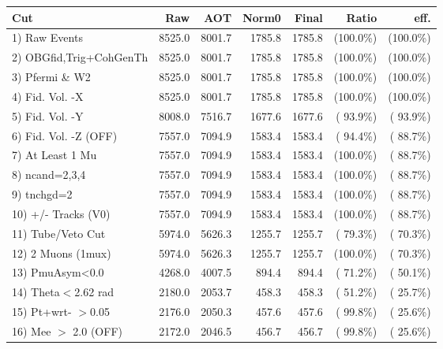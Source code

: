  \begin{table}[h!]\centering
 \begin{tabular}{||l||r|r|r|r|r|r||}
 \hline
 \hline
 Cut & Raw & AOT & Norm0 & Final & Ratio & eff.       \\
 \hline
  1) Raw Events           &       8525.0 &       8001.7 &       1785.8 &       1785.8 & (100.0\%) & (100.0\%) \\
  2) OBGfid,Trig+CohGenTh &       8525.0 &       8001.7 &       1785.8 &       1785.8 & (100.0\%) & (100.0\%) \\
  3) Pfermi \& W2         &       8525.0 &       8001.7 &       1785.8 &       1785.8 & (100.0\%) & (100.0\%) \\
  4) Fid. Vol. -X         &       8525.0 &       8001.7 &       1785.8 &       1785.8 & (100.0\%) & (100.0\%) \\
  5) Fid. Vol. -Y         &       8008.0 &       7516.7 &       1677.6 &       1677.6 & ( 93.9\%) & ( 93.9\%) \\
  6) Fid. Vol. -Z (OFF)   &       7557.0 &       7094.9 &       1583.4 &       1583.4 & ( 94.4\%) & ( 88.7\%) \\
  7) At Least 1 Mu        &       7557.0 &       7094.9 &       1583.4 &       1583.4 & (100.0\%) & ( 88.7\%) \\
  8) ncand=2,3,4          &       7557.0 &       7094.9 &       1583.4 &       1583.4 & (100.0\%) & ( 88.7\%) \\
  9) tnchgd=2             &       7557.0 &       7094.9 &       1583.4 &       1583.4 & (100.0\%) & ( 88.7\%) \\
 10) +/- Tracks (V0)      &       7557.0 &       7094.9 &       1583.4 &       1583.4 & (100.0\%) & ( 88.7\%) \\
 11) Tube/Veto Cut        &       5974.0 &       5626.3 &       1255.7 &       1255.7 & ( 79.3\%) & ( 70.3\%) \\
 12) 2 Muons (1mux)       &       5974.0 &       5626.3 &       1255.7 &       1255.7 & (100.0\%) & ( 70.3\%) \\
 13) PmuAsym<0.0          &       4268.0 &       4007.5 &        894.4 &        894.4 & ( 71.2\%) & ( 50.1\%) \\
 14) Theta$<$2.62 rad     &       2180.0 &       2053.7 &        458.3 &        458.3 & ( 51.2\%) & ( 25.7\%) \\
 15) Pt+wrt- $>$0.05      &       2176.0 &       2050.3 &        457.6 &        457.6 & ( 99.8\%) & ( 25.6\%) \\
 16) Mee $>$ 2.0  (OFF)   &       2172.0 &       2046.5 &        456.7 &        456.7 & ( 99.8\%) & ( 25.6\%) \\

\end{tabular}
\end{table}
